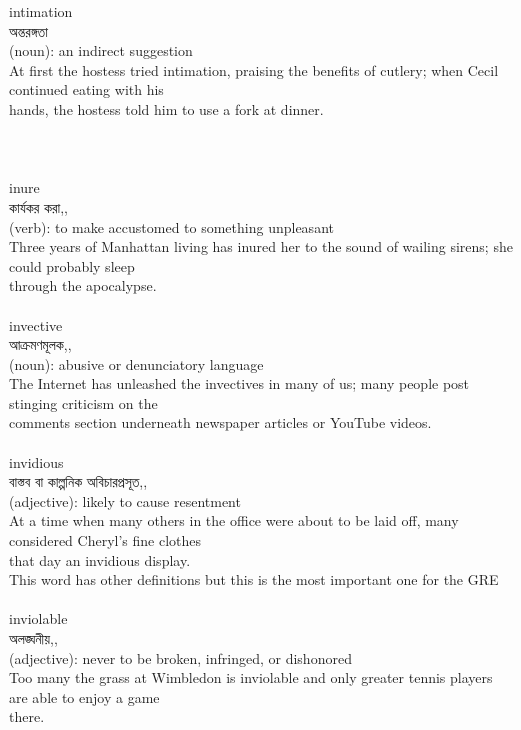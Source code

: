 \documentclass{article}
\begin{document}
{{intimation}\\
{অন্তরঙ্গতা}\\
{(noun): an indirect suggestion\\At first the hostess tried intimation, praising the benefits of cutlery; when Cecil continued eating with his\\hands, the hostess told him to use a fork at dinner.\\\\                                                                                   \\}\\
{inure}\\
{কার্যকর করা,,}\\
{(verb): to make accustomed to something unpleasant\\Three years of Manhattan living has inured her to the sound of wailing sirens; she could probably sleep\\through the apocalypse.\\}\\
{invective}\\
{আক্রমণমূলক,,}\\
{(noun): abusive or denunciatory language\\The Internet has unleashed the invectives in many of us; many people post stinging criticism on the\\comments section underneath newspaper articles or YouTube videos.\\}\\
{invidious}\\
{বাস্তব বা কাল্পনিক অবিচারপ্রসূত,,}\\
{(adjective): likely to cause resentment\\At a time when many others in the office were about to be laid off, many considered Cheryl's fine clothes\\that day an invidious display.\\This word has other definitions but this is the most important one for the GRE\\}\\
{inviolable}\\
{অলঙ্ঘনীয়,,}\\
{(adjective): never to be broken, infringed, or dishonored\\Too many the grass at Wimbledon is inviolable and only greater tennis players are able to enjoy a game\\there.\\}\\
}
\end{document}
